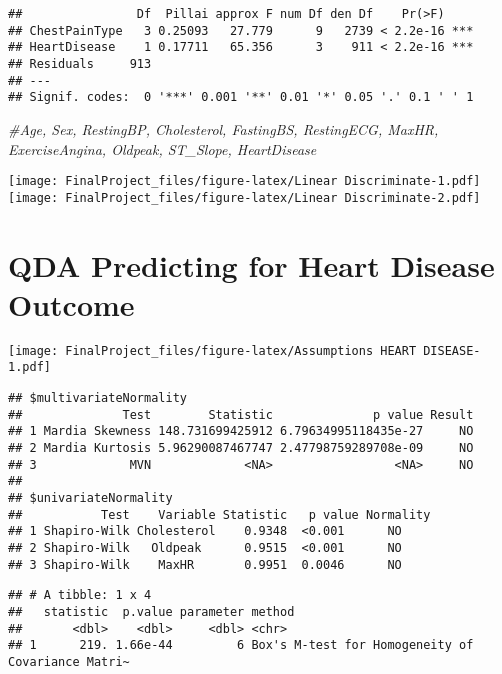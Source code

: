 \documentclass[
]{article}
\newenvironment{Shaded}{\begin{snugshade}}{\end{snugshade}}
\newcommand{\CommentTok}[1]{\textcolor[rgb]{0.56,0.35,0.01}{\textit{#1}}}
\begin{document}
\begin{verbatim}
##                Df  Pillai approx F num Df den Df    Pr(>F)    
## ChestPainType   3 0.25093   27.779      9   2739 < 2.2e-16 ***
## HeartDisease    1 0.17711   65.356      3    911 < 2.2e-16 ***
## Residuals     913                                             
## ---
## Signif. codes:  0 '***' 0.001 '**' 0.01 '*' 0.05 '.' 0.1 ' ' 1
\end{verbatim}

\begin{Shaded}
\begin{Highlighting}[]
\CommentTok{\#Age, Sex, RestingBP, Cholesterol, FastingBS, RestingECG, MaxHR, ExerciseAngina, Oldpeak, ST\_Slope, HeartDisease}
\end{Highlighting}
\end{Shaded}

\texttt{[image: FinalProject\_files/figure-latex/Linear Discriminate-1.pdf]}
\texttt{[image: FinalProject\_files/figure-latex/Linear Discriminate-2.pdf]}

\hypertarget{qda-predicting-for-heart-disease-outcome}{%
\section{QDA Predicting for Heart Disease
Outcome}\label{qda-predicting-for-heart-disease-outcome}}

\texttt{[image: FinalProject\_files/figure-latex/Assumptions HEART DISEASE-1.pdf]}

\begin{verbatim}
## $multivariateNormality
##              Test        Statistic              p value Result
## 1 Mardia Skewness 148.731699425912 6.79634995118435e-27     NO
## 2 Mardia Kurtosis 5.96290087467747 2.47798759289708e-09     NO
## 3             MVN             <NA>                 <NA>     NO
## 
## $univariateNormality
##           Test    Variable Statistic   p value Normality
## 1 Shapiro-Wilk Cholesterol    0.9348  <0.001      NO    
## 2 Shapiro-Wilk   Oldpeak      0.9515  <0.001      NO    
## 3 Shapiro-Wilk    MaxHR       0.9951  0.0046      NO
\end{verbatim}

\begin{verbatim}
## # A tibble: 1 x 4
##   statistic  p.value parameter method                                           
##       <dbl>    <dbl>     <dbl> <chr>                                            
## 1      219. 1.66e-44         6 Box's M-test for Homogeneity of Covariance Matri~
\end{verbatim}
\end{document}
